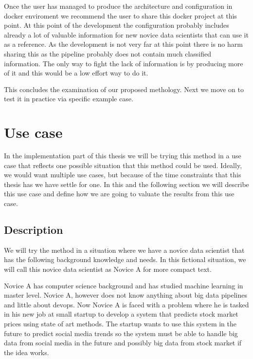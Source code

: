 Once the user has managed to produce the architecture and configuration in docker enviroment we recommend the user to share this docker project at this point.
At this point of the development the configuration probably includes already a lot of valuable information for new novice data scientists that can use it as a reference.
As the development is not very far at this point there is no harm sharing this as the pipeline probably does not contain much classified information.
The only way to fight the lack of information is by producing more of it and this would be a low effort way to do it.

This concludes the examination of our proposed methology. 
Next we move on to test it in practice via specific example case.

\section{Use case}

In the implementation part of this thesis we will be trying this method in a use case that reflects one possible situation that this method could be used.
Ideally, we would want multiple use cases, but because of the time constraints that this thesis has we have settle for one.
In this and the following section we will describe this use case and define how we are going to valuate the results from this use case.

\subsection{Description}

We will try the method in a situation where we have a novice data scientist that has the following background knowledge and needs.
In this fictional situation, we will call this novice data scientist as Novice A for more compact text.

Novice A has computer science background and has studied machine learning in master level.
Novice A, however does not know anything about big data pipelines and little about devops.
Now Novice A is faced with a problem where he is tasked in his new job at small startup to develop a system that predicts stock market prices using state of art methods.
The startup wants to use this system in the future to predict social media trends so the system must be able to handle big data from social media in the future and possibly big data from stock market if the idea works.


